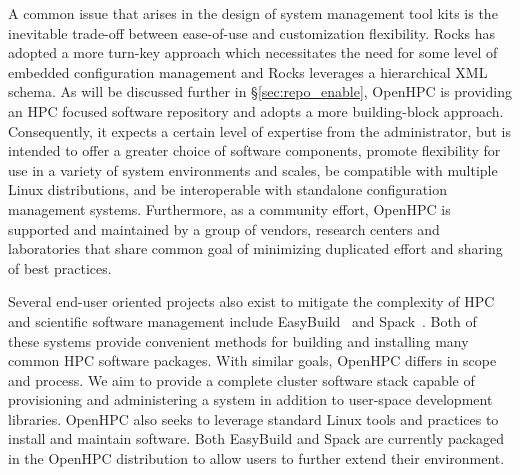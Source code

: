 A common issue that arises in the design of system management tool kits is the
inevitable trade-off between ease-of-use and customization flexibility. Rocks
has adopted a more turn-key approach which necessitates the need for some level
of embedded configuration management and Rocks leverages a hierarchical XML
schema. As will be discussed further in \S\ref{sec:repo_enable}, OpenHPC is
providing an HPC focused software repository and adopts a more building-block
approach. Consequently, it expects a certain level of expertise from the
administrator, but is intended to offer a greater choice of software
components, promote flexibility for use in a variety of system environments
and scales, be compatible with multiple Linux distributions, and be
interoperable with standalone configuration management systems.
Furthermore, as
a community effort, OpenHPC is supported and maintained by a group of vendors,
research centers and laboratories that share common goal of minimizing
duplicated effort and sharing of best practices.

Several end-user oriented projects also exist to mitigate the complexity of HPC
and scientific software management include EasyBuild~\cite{easybuild2012} and
Spack~\cite{spack2015}.  Both of these systems provide convenient methods for
building and installing many common HPC software packages. With similar goals,
OpenHPC differs in scope and process. We aim to provide a complete cluster
software stack capable of provisioning and administering a system in addition
to user-space development libraries. OpenHPC also seeks to leverage standard
Linux tools and practices to install and maintain software. Both EasyBuild and
Spack are currently packaged in the OpenHPC distribution to allow users to
further extend their environment.
